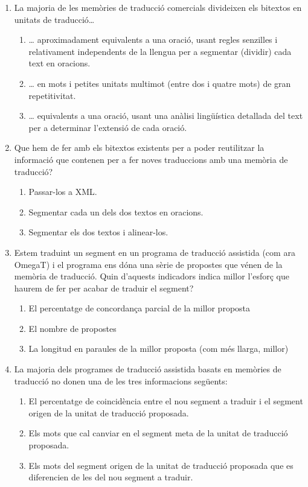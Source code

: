 \begin{enumerate}
\item La majoria de les memòries de traducció comercials divideixen
      els bitextos en unitats de traducció{\ldots}
   
\begin{enumerate}
\item {\ldots} aproximadament equivalents a una oració, usant
      regles senzilles i relativament independents de la llengua per a
      segmentar (dividir) cada text en oracions.
\item {\ldots} en mots i petites unitats multimot (entre dos i
      quatre mots) de gran repetitivitat.
\item {\ldots} equivalents a una oració, usant una anàlisi
      lingüística detallada del
      text per a determinar l'extensió de cada oració.
\end{enumerate}
\item Que hem de fer amb els bitextos existents per a poder reutilitzar la
   informació que contenen per a fer noves traduccions amb una memòria
   de traducció?
   
\begin{enumerate}
\item Passar-los a XML.
\item Segmentar cada un dels dos textos en oracions.
\item Segmentar els dos textos i alinear-los.
\end{enumerate}

\item Estem traduint un segment en un programa de traducció assistida
  (com ara OmegaT) i el programa ens dóna una sèrie de propostes que
  vénen de la memòria de traducció. Quin d'aquests indicadors indica
  millor l'esforç que haurem de fer per acabar de traduir el segment?
  \begin{enumerate}
\item El percentatge de concordança parcial de la millor
    proposta
\item El nombre de propostes
\item La longitud en
    paraules de la millor proposta (com més llarga, millor)
  \end{enumerate}


\item La majoria dels programes de traducció assistida basats en
  memòries de traducció no donen una de les tres informacions
  següents: 
  \begin{enumerate}
  \item El percentatge de coincidència entre el nou
    segment a traduir i el segment origen de la unitat de traducció
    proposada. 
  \item Els mots que cal canviar en el segment
    meta de la unitat de traducció proposada.
  \item Els mots del
    segment origen de la unitat de traducció proposada que es
    diferencien de les del nou segment a traduir.
  \end{enumerate}



\end{enumerate}
